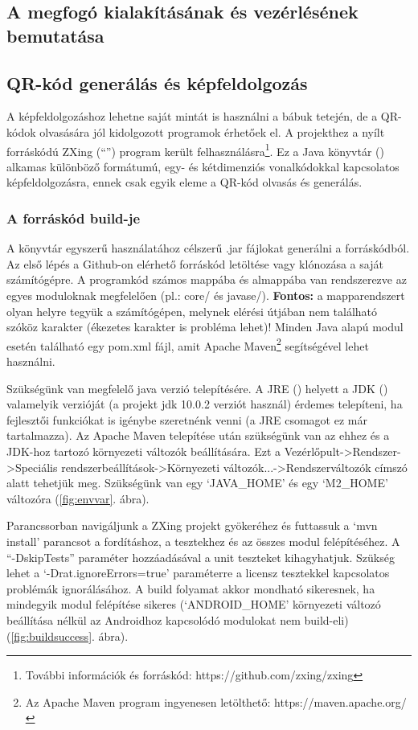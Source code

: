\documentclass[../documentation.tex]{subfiles}
\begin{document}
\subsection{A megfogó kialakításának és vezérlésének bemutatása}

\subsection{QR-kód generálás és képfeldolgozás}
A képfeldolgozáshoz lehetne saját mintát is használni a bábuk tetején, de a QR-kódok olvasására jól kidolgozott programok érhetőek el. A projekthez a nyílt forráskódú ZXing (``'') program került felhasználásra\footnote{További információk és forráskód: https://github.com/zxing/zxing}. Ez a Java könyvtár () alkamas különböző formátumú, egy- és kétdimenziós vonalkódokkal kapcsolatos képfeldolgozásra, ennek csak egyik eleme a QR-kód olvasás és generálás.

\subsubsection{A forráskód build-je}
A könyvtár egyszerű használatához célszerű .jar fájlokat generálni a forráskódból. Az első lépés a Github-on elérhető forráskód letöltése vagy klónozása a saját számítógépre. A programkód számos mappába és almappába van rendszerezve az egyes moduloknak megfelelően (pl.: core/ és javase/). \textbf{Fontos:} a mapparendszert olyan helyre tegyük a számítógépen, melynek elérési útjában nem található szóköz karakter (ékezetes karakter is probléma lehet)! Minden Java alapú modul esetén található egy pom.xml fájl, amit Apache Maven\footnote{Az Apache Maven program ingyenesen letölthető: https://maven.apache.org/} segítségével lehet használni.

Szükségünk van megfelelő java verzió telepítésére. A JRE () helyett a JDK () valamelyik verzióját (a projekt jdk 10.0.2 verziót használ) érdemes telepíteni, ha fejlesztői funkciókat is igénybe szeretnénk venni (a JRE csomagot ez már tartalmazza). Az Apache Maven telepítése után szükségünk van az ehhez és a JDK-hoz tartozó környezeti változók beállítására. Ezt a Vezérlőpult->Rendszer->Speciális rendszerbeállítások->Környezeti változók...->Rendszerváltozók címszó alatt tehetjük meg. Szükségünk van egy `JAVA\_HOME' és egy `M2\_HOME' változóra (\ref{fig:envvar}. ábra).

Parancssorban navigáljunk a ZXing projekt gyökeréhez és futtassuk a `mvn install' parancsot a fordításhoz, a tesztekhez és az összes modul felépítéséhez. A ``-DskipTests'' paraméter hozzáadásával a unit teszteket kihagyhatjuk. Szükség lehet a `-Drat.ignoreErrors=true' paraméterre a licensz tesztekkel kapcsolatos problémák ignorálásához. A build folyamat akkor mondható sikeresnek, ha mindegyik modul felépítése sikeres (`ANDROID\_HOME' környezeti változó beállítása nélkül az Androidhoz kapcsolódó modulokat nem build-eli) (\ref{fig:buildsuccess}. ábra).
\end{document}
